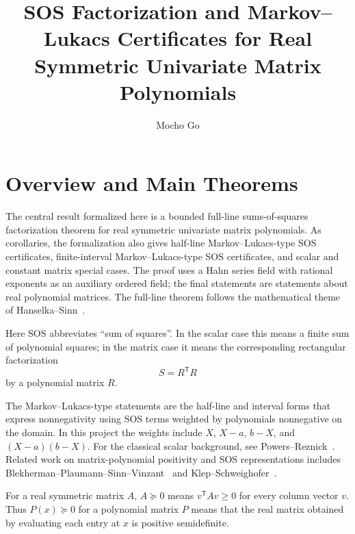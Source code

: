 \documentclass[uplatex,dvipdfmx]{jsarticle}
\title{SOS Factorization and Markov--Lukacs Certificates for Real Symmetric Univariate Matrix Polynomials}
\author{Mocho Go}
\date{}
\newcommand{\psd}{\succeq 0}
\theoremstyle{matrixsosdefinition}
\begin{document}
\maketitle

\section{Overview and Main Theorems}

The central result formalized here is a bounded full-line sums-of-squares
factorization theorem for real symmetric univariate matrix polynomials.  As
corollaries, the formalization also gives half-line Markov--Lukacs-type SOS certificates,
finite-interval Markov--Lukacs-type SOS certificates, and scalar and constant
matrix special cases.  The proof uses a Hahn series field with rational
exponents as an auxiliary ordered field; the final statements are statements
about real polynomial matrices.  The full-line theorem follows the mathematical
theme of Hanselka--Sinn~\cite{HanselkaSinn}.

Here SOS abbreviates ``sum of squares''.  In the scalar case this means a finite
sum of polynomial squares; in the matrix case it means the corresponding
rectangular factorization
\[
  S=R^{\mathsf T}R
\]
by a polynomial matrix \(R\).

The Markov--Lukacs-type statements are the half-line and interval forms that
express nonnegativity using SOS terms weighted by polynomials nonnegative on the
domain.  In this project the weights include \(X\), \(X-a\), \(b-X\), and
\((X-a)(b-X)\).  For the classical scalar background, see
Powers--Reznick~\cite{PowersReznick}.  Related work on matrix-polynomial
positivity and SOS representations includes
Blekherman--Plaumann--Sinn--Vinzant~\cite{BPSV} and
Klep--Schweighofer~\cite{KlepSchweighofer}.

For a real symmetric matrix \(A\), \(A\psd\) means
\(v^{\mathsf T}Av\ge0\) for every column vector \(v\).  Thus \(P(x)\psd\) for a
polynomial matrix \(P\) means that the real matrix obtained by evaluating each
entry at \(x\) is positive semidefinite.
\end{document}
